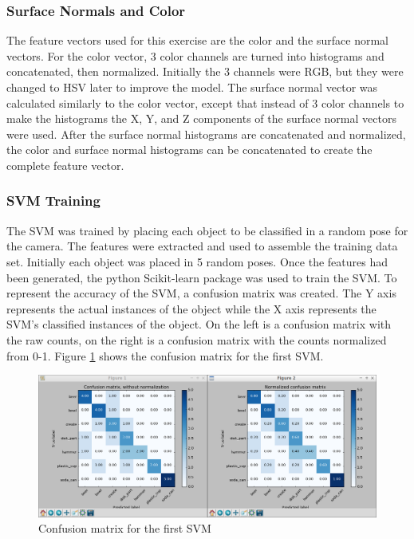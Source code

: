 \documentclass{article}
\begin{document}
\subsubsection{Surface Normals and Color}
The feature vectors used for this exercise are the color and the surface normal vectors. For the color vector, 3 color channels are turned into histograms and concatenated, then normalized. Initially the 3 channels were RGB, but they were changed to HSV later to improve the model. The surface normal vector was calculated similarly to the color vector, except that instead of 3 color channels to make the histograms the X, Y, and Z components of the surface normal vectors were used. After the surface normal histograms are concatenated and normalized, the color and surface normal histograms can be concatenated to create the complete feature vector.

\subsubsection{SVM Training}
The SVM was trained by placing each object to be classified in a random pose for the camera. The features were extracted and used to assemble the training data set. Initially each object was placed in 5 random poses. Once the features had been generated, the python Scikit-learn package was used to train the SVM. To represent the accuracy of the SVM, a confusion matrix was created. The Y axis represents the actual instances of the object while the X axis represents the SVM's classified instances of the object. On the left is a confusion matrix with the raw counts, on the right is a confusion matrix with the counts normalized from 0-1. Figure \ref{fig:SVMinit} shows the confusion matrix for the first SVM.

\begin{figure}[H]
    \includegraphics[width=\linewidth]{ex3SVMinitial.png}
    \caption{Confusion matrix for the first SVM}
    \label{fig:SVMinit}
\end{figure}
\end{document}
